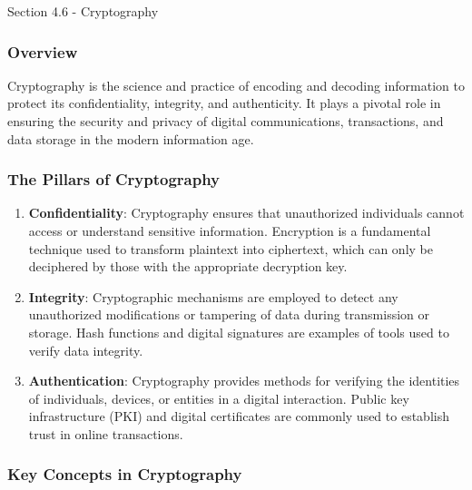 \begin{notes}{Section 4.6 - Cryptography}
    \subsubsection*{Overview}

    Cryptography is the science and practice of encoding and decoding information to protect its confidentiality, integrity, and authenticity. It plays a pivotal role in ensuring the security and 
    privacy of digital communications, transactions, and data storage in the modern information age.
    
    \subsubsection*{The Pillars of Cryptography}

    \begin{enumerate}
        \item \textbf{Confidentiality}: Cryptography ensures that unauthorized individuals cannot access or understand sensitive information. Encryption is a fundamental technique used to transform 
        plaintext into ciphertext, which can only be deciphered by those with the appropriate decryption key.
        \item \textbf{Integrity}: Cryptographic mechanisms are employed to detect any unauthorized modifications or tampering of data during transmission or storage. Hash functions and digital 
        signatures are examples of tools used to verify data integrity.
        \item \textbf{Authentication}: Cryptography provides methods for verifying the identities of individuals, devices, or entities in a digital interaction. Public key infrastructure (PKI) and 
        digital certificates are commonly used to establish trust in online transactions.
    \end{enumerate}
    
    \subsubsection*{Key Concepts in Cryptography}


\end{notes}
